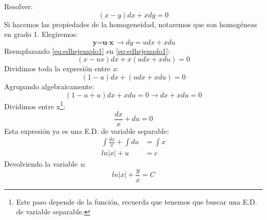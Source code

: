 \documentclass[11pt,fleqn]{book} %
\begin{document}
\begin{exercise}\label{eq:edhejemplo1}
Resolver:
\begin{equation}
(x-y)dx+xdy=0
\end{equation}
Si hacemos las propiedades de la homogeneidad, notaremos que son homogéneas en grado 1. Elegiremos:
\begin{equation}\label{eq:edhejemplo2}
\textbf{y=u$\cdot$x} \longrightarrow dy=udx+xdu
\end{equation}
Reemplazando \ref{eq:edhejemplo1} en \ref{eq:edhejemplo1}:
\begin{displaymath}
(x-ux)dx+x(udx+xdu)=0
\end{displaymath}
Dividimos toda la expresión entre \textit{x}:
\begin{displaymath}
(1-u)dx+(udx+xdu)=0
\end{displaymath}
Agrupando algebraicamente:
\begin{displaymath}
(1-u+u)dx+xdu=0 \longrightarrow  dx+xdu=0
\end{displaymath}
Dividimos entre x\footnote{Este paso depende de la función, recuerda que tenemos que buscar una E.D. de variable separable.}:
\begin{displaymath}
\frac{dx}{x}+du=0
\end{displaymath}
Esta expresión ya es una E.D. de variable separable:
\begin{displaymath}
\begin{split}
\int\frac{dx}{x}+\int du&=\int x\\
ln|x|+u&=c
\end{split}
\end{displaymath}
Devolviendo la variable \textit{u}:
\begin{equation*}
\boxed{ln|x|+\frac{y}{x}=C}
\end{equation*}
\end{exercise}
\end{document}
